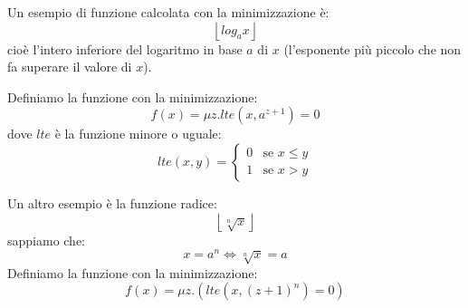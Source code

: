 \documentclass[a4paper]{article}
\begin{document}
\begin{example}
  Un esempio di funzione calcolata con la minimizzazione è:
  \[
    \left\lfloor log_a x \right\rfloor
  \]
  cioè l'intero inferiore del logaritmo in base \( a \) di \( x \) (l'esponente più
  piccolo che non fa superare il valore di \( x \)).

  Definiamo la funzione con la minimizzazione:
  \[
    f(x) = \mu z. lte(x, a^{z+1}) = 0
  \] 
  dove \( lte \) è la funzione minore o uguale:
  \[
    lte(x, y) = \begin{cases}
      0 & \text{se } x \le y \\
      1 & \text{se } x > y
    \end{cases}
  \] 
\end{example}
\begin{example}
  Un altro esempio è la funzione radice:
  \[
    \left\lfloor \sqrt[n]{x} \right\rfloor
  \]
  sappiamo che:
  \[
    x = a^n \iff \sqrt[n]{x} = a
  \] 
  Definiamo la funzione con la minimizzazione:
  \[
    f(x) = \mu z. \left( lte\left(x, \left(z+1\right)^n\right) = 0 \right) 
  \] 
\end{example}
\end{document}
